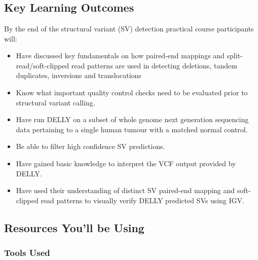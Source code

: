 
\chapter{\moduleTitle}
\newpage

\section{Key Learning Outcomes}
By the end of the structural variant (SV) detection practical course participants will:
\begin{itemize}
  \item Have discussed key fundamentals on how paired-end mappings and split-read/soft-clipped read patterns are used in detecting deletions, tandem duplicates, inversions and translocations 
  \item Know what important quality control checks need to be evaluated prior to structural variant calling. 
  \item Have run DELLY on a subset of whole genome next generation sequencing data pertaining to a single human tumour with a matched normal control.
  \item Be able to filter high confidence SV predictions. 
  \item Have gained basic knowledge to interpret the VCF output provided by DELLY.
  \item Have used their understanding of distinct SV paired-end mapping and soft-clipped read patterns to visually verify DELLY predicted SVs using IGV.
\end{itemize}

\section{Resources You'll be Using}
 
\subsection{Tools Used}
\begin{description}[style=multiline,labelindent=0cm,align=left,leftmargin=0.5cm]
  \item[]\hfill\\
  	\url{}
  \item[]\hfill\\
  	\url{}
\end{description}

